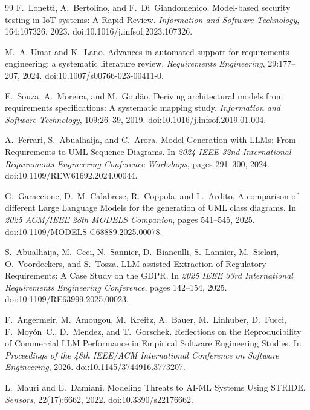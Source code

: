 \documentclass[12pt,a4paper,oneside]{report}
\begin{document}
\begin{thebibliography}{99}
F.~Lonetti, A.~Bertolino, and F.~Di~Giandomenico.
\newblock Model-based security testing in IoT systems: A Rapid Review.
\newblock \emph{Information and Software Technology}, 164:107326, 2023.
\newblock doi:10.1016/j.infsof.2023.107326.

M.~A. Umar and K.~Lano.
\newblock Advances in automated support for requirements engineering: a systematic literature review.
\newblock \emph{Requirements Engineering}, 29:177--207, 2024.
\newblock doi:10.1007/s00766-023-00411-0.

E.~Souza, A.~Moreira, and M.~Goul{\~a}o.
\newblock Deriving architectural models from requirements specifications: A systematic mapping study.
\newblock \emph{Information and Software Technology}, 109:26--39, 2019.
\newblock doi:10.1016/j.infsof.2019.01.004.

A.~Ferrari, S.~Abualhaija, and C.~Arora.
\newblock Model Generation with LLMs: From Requirements to UML Sequence Diagrams.
\newblock In \emph{2024 IEEE 32nd International Requirements Engineering Conference Workshops}, pages 291--300, 2024.
\newblock doi:10.1109/REW61692.2024.00044.

G.~Garaccione, D.~M. Calabrese, R.~Coppola, and L.~Ardito.
\newblock A comparison of different Large Language Models for the generation of UML class diagrams.
\newblock In \emph{2025 ACM/IEEE 28th MODELS Companion}, pages 541--545, 2025.
\newblock doi:10.1109/MODELS-C68889.2025.00078.

S.~Abualhaija, M.~Ceci, N.~Sannier, D.~Bianculli, S.~Lannier, M.~Siclari, O.~Voordeckers, and S.~Tosza.
\newblock LLM-assisted Extraction of Regulatory Requirements: A Case Study on the GDPR.
\newblock In \emph{2025 IEEE 33rd International Requirements Engineering Conference}, pages 142--154, 2025.
\newblock doi:10.1109/RE63999.2025.00023.

F.~Angermeir, M.~Amougou, M.~Kreitz, A.~Bauer, M.~Linhuber, D.~Fucci, F.~Moy{\'o}n~C., D.~Mendez, and T.~Gorschek.
\newblock Reflections on the Reproducibility of Commercial LLM Performance in Empirical Software Engineering Studies.
\newblock In \emph{Proceedings of the 48th IEEE/ACM International Conference on Software Engineering}, 2026.
\newblock doi:10.1145/3744916.3773207.

L.~Mauri and E.~Damiani.
\newblock Modeling Threats to AI-ML Systems Using STRIDE.
\newblock \emph{Sensors}, 22(17):6662, 2022.
\newblock doi:10.3390/s22176662.

\end{thebibliography}
\end{document}
